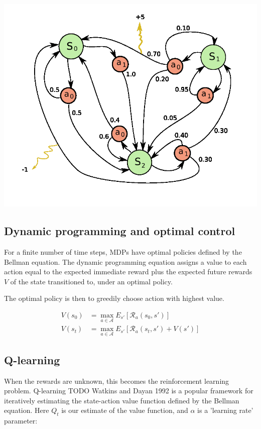 \documentclass[11pt,a4,singlespacing,titlepagenumber=on]{scrreprt}
\numberwithin{equation}{chapter} %
\theoremstyle{remark}
\begin{document}
\includegraphics[scale=0.5]{MDP_example.png}

\subsection{ Dynamic programming and optimal control }

For a finite number of time steps, MDPs have optimal policies defined by the Bellman equation. The dynamic programming equation assigns a value to each action equal to the expected immediate reward plus the expected future rewards $V$ of the state transitioned to, under an optimal policy.

The optimal policy is then to greedily choose action with highest value.

\begin{align}
	V(s_0) &= \max_{a \in \mathcal{A}} E_{s'}[\mathcal{R}_a(s_0,s')] \\
	V(s_t) &= \max_{a \in \mathcal{A}} E_{s'}[\mathcal{R}_a(s_t,s') + V(s')]
\end{align}

\subsection{ Q-learning }

When the rewards are unknown, this becomes the reinforcement learning problem. Q-learning TODO Watkins and Dayan 1992 is a popular framework for iteratively estimating the state-action value function defined by the Bellman equation. Here $Q_t$ is our estimate of the value function, and $\alpha$ is a 'learning rate' parameter:
\end{document}
